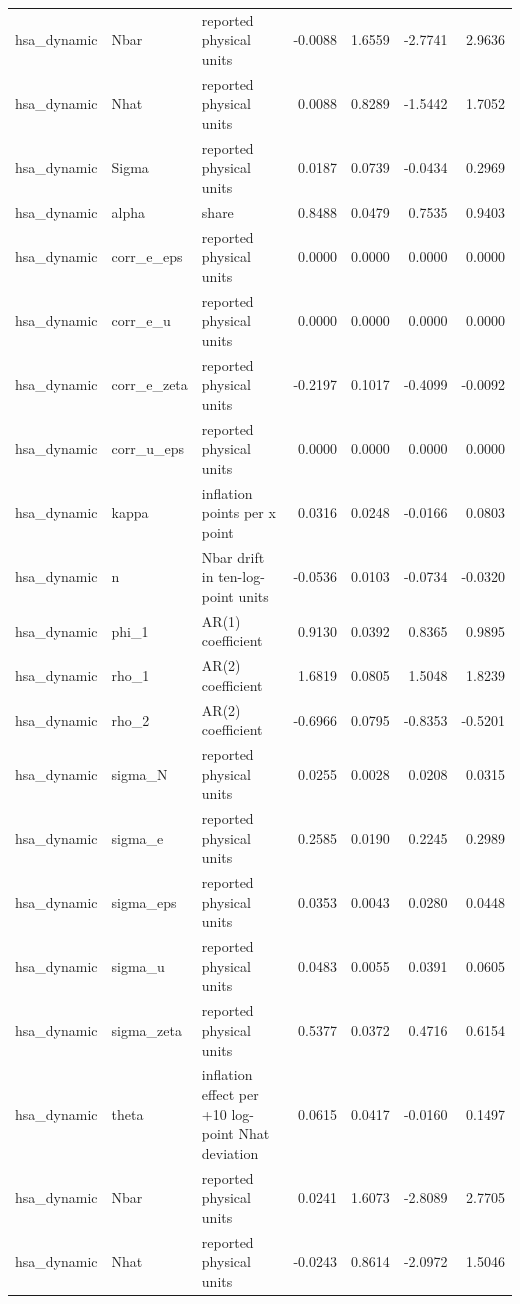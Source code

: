\begin{tabular}{lllrrrr}
hsa\_dynamic & Nbar & reported physical units & -0.0088 & 1.6559 & -2.7741 & 2.9636 \\
hsa\_dynamic & Nhat & reported physical units & 0.0088 & 0.8289 & -1.5442 & 1.7052 \\
hsa\_dynamic & Sigma & reported physical units & 0.0187 & 0.0739 & -0.0434 & 0.2969 \\
hsa\_dynamic & alpha & share & 0.8488 & 0.0479 & 0.7535 & 0.9403 \\
hsa\_dynamic & corr\_e\_eps & reported physical units & 0.0000 & 0.0000 & 0.0000 & 0.0000 \\
hsa\_dynamic & corr\_e\_u & reported physical units & 0.0000 & 0.0000 & 0.0000 & 0.0000 \\
hsa\_dynamic & corr\_e\_zeta & reported physical units & -0.2197 & 0.1017 & -0.4099 & -0.0092 \\
hsa\_dynamic & corr\_u\_eps & reported physical units & 0.0000 & 0.0000 & 0.0000 & 0.0000 \\
hsa\_dynamic & kappa & inflation points per x point & 0.0316 & 0.0248 & -0.0166 & 0.0803 \\
hsa\_dynamic & n & Nbar drift in ten-log-point units & -0.0536 & 0.0103 & -0.0734 & -0.0320 \\
hsa\_dynamic & phi\_1 & AR(1) coefficient & 0.9130 & 0.0392 & 0.8365 & 0.9895 \\
hsa\_dynamic & rho\_1 & AR(2) coefficient & 1.6819 & 0.0805 & 1.5048 & 1.8239 \\
hsa\_dynamic & rho\_2 & AR(2) coefficient & -0.6966 & 0.0795 & -0.8353 & -0.5201 \\
hsa\_dynamic & sigma\_N & reported physical units & 0.0255 & 0.0028 & 0.0208 & 0.0315 \\
hsa\_dynamic & sigma\_e & reported physical units & 0.2585 & 0.0190 & 0.2245 & 0.2989 \\
hsa\_dynamic & sigma\_eps & reported physical units & 0.0353 & 0.0043 & 0.0280 & 0.0448 \\
hsa\_dynamic & sigma\_u & reported physical units & 0.0483 & 0.0055 & 0.0391 & 0.0605 \\
hsa\_dynamic & sigma\_zeta & reported physical units & 0.5377 & 0.0372 & 0.4716 & 0.6154 \\
hsa\_dynamic & theta & inflation effect per +10 log-point Nhat deviation & 0.0615 & 0.0417 & -0.0160 & 0.1497 \\
hsa\_dynamic & Nbar & reported physical units & 0.0241 & 1.6073 & -2.8089 & 2.7705 \\
hsa\_dynamic & Nhat & reported physical units & -0.0243 & 0.8614 & -2.0972 & 1.5046 \\

\end{tabular}
